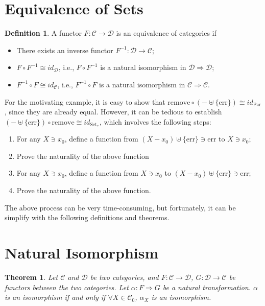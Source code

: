 \documentclass[12pt]{article}
\theoremstyle{plain}
\newtheorem{theorem}{Theorem}
\theoremstyle{definition}
\newtheorem{definition}{Definition}
\theoremstyle{remark}
\newcommand{\cat}[1]{\mathcal{#1}}
\newcommand{\Par}{\mathrm{Par}}
\newcommand{\PSet}{\mathrm{Set}_*}
\newcommand{\err}{\mathrm{err}}
\newcommand{\remove}{\mathrm{remove}}
\begin{document}
\section{Equivalence of Sets}

\begin{definition}
    A functor $F:\cat{C} \to \cat{D}$ is an equivalence of categories if
    \begin{itemize}
        \item There exists an inverse functor $F^{-1}:\cat{D} \to \cat{C}$;
        \item $F\circ F^{-1} \cong id_{\cat{D}}$, i.e., $F\circ F^{-1}$ is a natural isomorphism in $\cat{D}\Rightarrow \cat{D}$;
        \item $F^{-1}\circ F\cong id_{\cat{C}}$, i.e., $F^{-1} \circ F$ is a natural isomorphism in $\cat{C} \Rightarrow \cat{C}$.
    \end{itemize}
\end{definition}

For the motivating example, it is easy to show that $\remove \circ (-\uplus \{\err\}) \cong id_{\Par}$, since they are already equal. However, it can be tedious to establish $(-\uplus\{\err\})\circ \remove \cong id_{\PSet}$, which involves the following steps:
\begin{enumerate}
    \item For any $X\ni x_0$, define a function from $(X - x_0) \uplus \{\err\} \ni \err$ to $X\ni x_0$;
    \item Prove the naturality of the above function
    \item For any $X\ni x_0$, define a function from $X\ni x_0$ to $(X-x_0) \uplus \{\err\}\ni \err$;
    \item Prove the naturality of the above function.
\end{enumerate}
The above process can be very time-consuming, but fortunately, it can be simplify with the following definitions and theorems.

\section{Natural Isomorphism}

\begin{theorem}
    Let $\cat{C}$ and $\cat{D}$ be two categories, and $F:\cat C \to \cat D$, $G: \cat{D} \to \cat{C}$ be functors between the two categories. Let $\alpha: F\Rightarrow G$ be a natural transformation. $\alpha$ is an isomorphism if and only if $\forall X \in \cat{C}_0$, $\alpha_X$ is an isomorphism.
\end{theorem}
\end{document}
